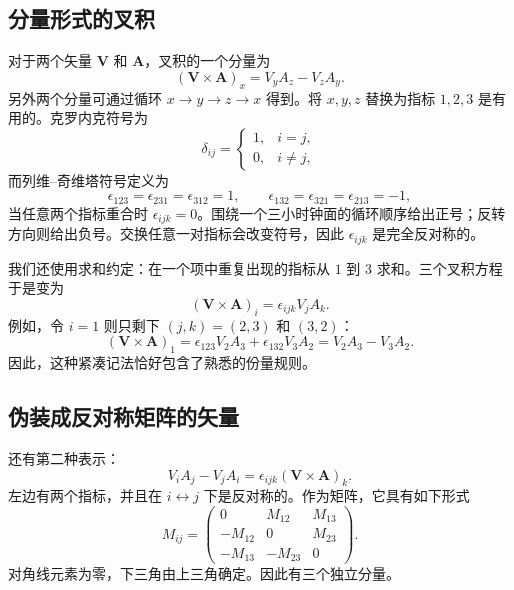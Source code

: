 \subsection{分量形式的叉积}

对于两个矢量 \(\mathbf V\) 和 \(\mathbf A\)，叉积的一个分量为
\begin{equation}
  (\mathbf V\times\mathbf A)_x
  =
  V_yA_z-V_zA_y.
\end{equation}
另外两个分量可通过循环 \(x\to y\to z\to x\) 得到。将 \(x,y,z\) 替换为指标 \(1,2,3\) 是有用的。克罗内克符号为
\begin{equation}
  \delta_{ij}
  =
  \begin{cases}
    1,&i=j,\\
    0,&i\ne j,
  \end{cases}
\end{equation}
而列维--奇维塔符号定义为
\begin{equation}
  \epsilon_{123}=\epsilon_{231}=\epsilon_{312}=1,
  \qquad
  \epsilon_{132}=\epsilon_{321}=\epsilon_{213}=-1,
\end{equation}
当任意两个指标重合时 \(\epsilon_{ijk}=0\)。围绕一个三小时钟面的循环顺序给出正号；反转方向则给出负号。交换任意一对指标会改变符号，因此 \(\epsilon_{ijk}\) 是完全反对称的。

我们还使用求和约定：在一个项中重复出现的指标从 \(1\) 到 \(3\) 求和。三个叉积方程于是变为
\begin{equation}
  (\mathbf V\times\mathbf A)_i
  =
  \epsilon_{ijk}V_jA_k.
\end{equation}
例如，令 \(i=1\) 则只剩下 \((j,k)=(2,3)\) 和 \((3,2)\)：
\begin{equation}
  (\mathbf V\times\mathbf A)_1
  =
  \epsilon_{123}V_2A_3
  +\epsilon_{132}V_3A_2
  =
  V_2A_3-V_3A_2.
\end{equation}
因此，这种紧凑记法恰好包含了熟悉的份量规则。

\subsection{伪装成反对称矩阵的矢量}

还有第二种表示：
\begin{equation}
  V_iA_j-V_jA_i
  =
  \epsilon_{ijk}(\mathbf V\times\mathbf A)_k.
\end{equation}
左边有两个指标，并且在 \(i\leftrightarrow j\) 下是反对称的。作为矩阵，它具有如下形式
\begin{equation}
  M_{ij}
  =
  \begin{pmatrix}
    0&M_{12}&M_{13}\\
    -M_{12}&0&M_{23}\\
    -M_{13}&-M_{23}&0
  \end{pmatrix}.
\end{equation}
对角线元素为零，下三角由上三角确定。因此有三个独立分量。

